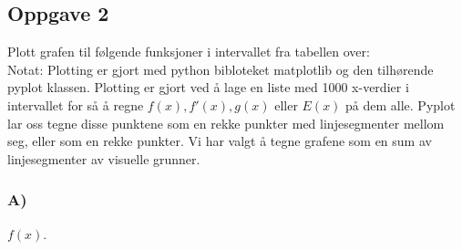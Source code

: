 \subsection{Oppgave 2}
Plott grafen til følgende funksjoner i intervallet fra tabellen over:\\
Notat: Plotting er gjort med python bibloteket matplotlib og den tilhørende pyplot klassen.
Plotting er gjort ved å lage en liste med 1000 x-verdier i intervallet for så å regne $f(x), f'(x), g(x)$ eller $E(x)$ på dem alle.
Pyplot lar oss tegne disse punktene som en rekke punkter med linjesegmenter mellom seg, eller som en rekke punkter. Vi har valgt å tegne grafene som en sum av linjesegmenter av visuelle grunner.
    \subsubsection{A)} $f(x).$
